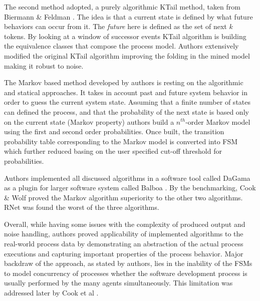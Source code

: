 The second method adopted, a purely algorithmic KTail method, taken from Biermann \& Feldman \cite{citeulike:5120603}. The idea is that a current state is defined by what future behaviors can occur from it. The \textit{future} here is defined as the set of next $k$ tokens. By looking at a window of successor events KTail algorithm is building the equivalence classes that compose the process model. Authors extensively modified the original KTail algorithm improving the folding in the mined model making it robust to noise.

The Markov based method developed by authors is resting on the algorithmic and statical approaches. It takes in account past and future system behavior in order to guess the current system state. Assuming that a finite number of states can defined the process, and that the probability of the next state is based only on the current state (Markov property) authors build a $n^{th}$-order Markov model using the first and second order probabilities. Once built, the transition probability table corresponding to the Markov model is converted into FSM which further reduced basing on the user specified cut-off threshold for probabilities.

Authors implemented all discussed algorithms in a software tool called DaGama as a plugin for larger software system called Balboa \cite{citeulike:5120757}. By the benchmarking, Cook \& Wolf proved the Markov algorithm superiority to the other two algorithms. RNet was found the worst of the three algorithms. 

Overall, while having some issues with the complexity of produced output and noise handling, authors proved applicability of implemented algorithms to the real-world process data by demonstrating an abstraction of the actual process executions and capturing important properties of the process behavior. Major backdraw of the approach, as stated by authors, lies in the inability of the FSMs to model concurrency of processes whether the software development process is usually performed by the many agents simultaneously. This limitation was addressed later by Cook et al \cite{citeulike:5128143}.
